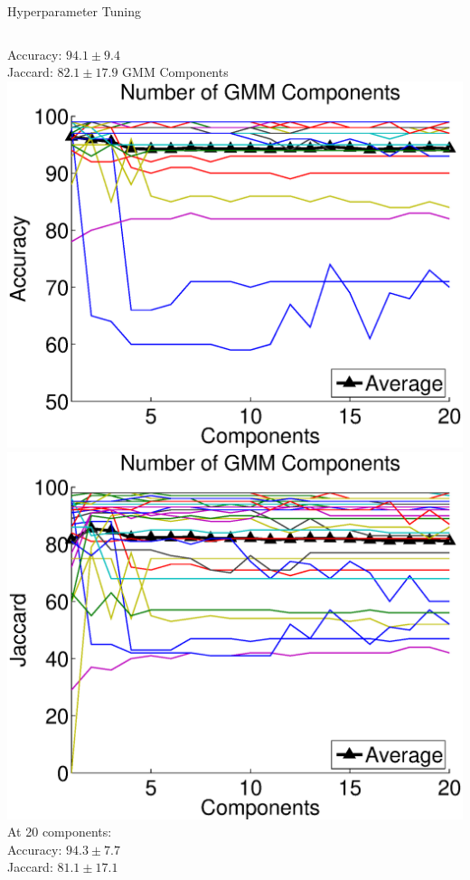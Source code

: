 \documentclass[compress,aspectratio=43]{beamer}
\begin{document}
\begin{frame}{Hyperparameter Tuning}
\begin{columns}[t]
{Accuracy: $94.1 \pm 9.4$\\
\vspace{-2mm}
Jaccard: $82.1 \pm 17.9$
}
\centering
{\scriptsize GMM Components}\\ \vspace{2mm}
\includegraphics[width=1\linewidth]{figures/hyperparameter_tuning/components/accuracy.eps}\\
\includegraphics[width=1\linewidth]{figures/hyperparameter_tuning/components/jaccard.eps}\\
{\tiny
At 20 components:\\
Accuracy: $94.3 \pm 7.7$\\
\vspace{-2mm}
Jaccard: $81.1 \pm 17.1$
}


\end{columns}
\end{frame}
\end{document}
